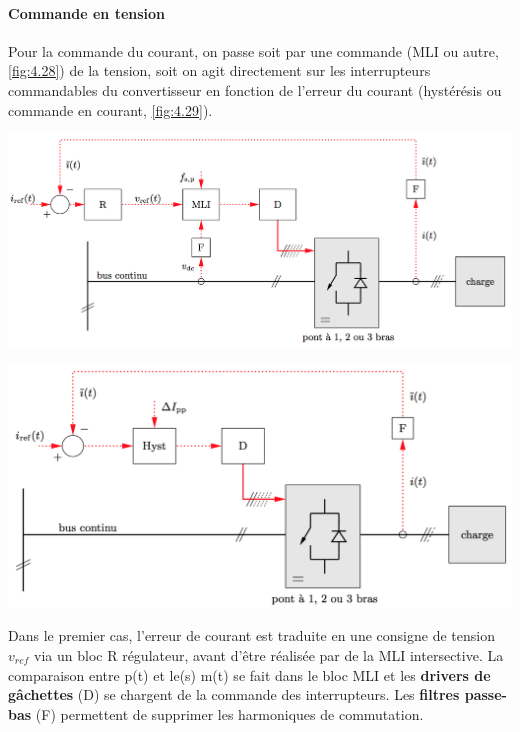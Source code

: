 	\paragraph{Commande en tension}\quad 
	Pour la commande du courant, on passe soit par une commande (MLI ou autre, \autoref{fig:4.28}) de la tension, soit on agit directement sur les interrupteurs commandables du convertisseur en fonction de l'erreur du courant (hystérésis ou commande en courant, \autoref{fig:4.29}). 
	\begin{center}
	\begin{minipage}{0.49\textwidth}
	\includegraphics[scale=0.28]{ch4/31}
	\label{fig:4.28}
	\end{minipage}
	\begin{minipage}{0.49\textwidth}
	\includegraphics[scale=0.29]{ch4/32}
	\label{fig:4.29}
	\end{minipage}
	\end{center}
	
	Dans le premier cas, l'erreur de courant est traduite en une consigne de tension $v_{ref}$ via un bloc R régulateur, avant d'être réalisée par de la MLI intersective. La comparaison entre p(t) et le(s) m(t) se fait dans le bloc MLI et les \textbf{drivers de gâchettes} (D) se chargent de la commande des interrupteurs. Les \textbf{filtres passe-bas} (F) permettent de supprimer les harmoniques de commutation. 
	
